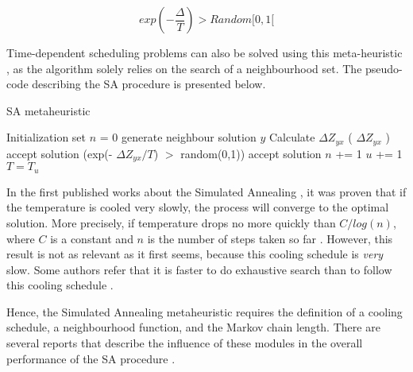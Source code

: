 \begin{equation}
\label{eq:metropolis}
  exp(-\frac{\Delta}{T}) > Random[0, 1[
\end{equation}

Time-dependent scheduling problems can also be solved using this meta-heuristic \cite{simulated_annealing_2}, as the algorithm solely relies on the search of a neighbourhood set. The pseudo-code describing the SA procedure  is presented below.

\makeatletter
\def\BState{\State\hskip-\ALG@thistlm}
\makeatother

\begin{algorithm}
\caption{SA metaheuristic}\label{eq:sa_metacode}
  \begin{algorithmic}[1]
    \State Initialization 
    \State set $n$ = 0
    \State generate neighbour solution $y$
    \State  Calculate $\Delta Z_{yx}$
    \If ( $\Delta Z_{yx}$ ) 
    \State accept solution 
    \Elif (exp(- $\Delta Z_{yx}/T$) $>$ random(0,1)) 
    \State accept solution
    \State  $n$ += 1
    \EndWhile
    \State  $u$ += 1
    \State $  T = T_{u}$
    \EndWhile
    \EndProcedure
  \end{algorithmic}
\end{algorithm}


In the first published works about the Simulated Annealing \cite{sa_convergence}, it was proven that if the temperature is cooled very slowly, the process will converge to the optimal solution. More precisely, if temperature drops no more quickly than $C/log(n)$, where $C$ is a constant and $n$ is the number of steps taken so far \cite{local_search_book}. However, this result is not as relevant as it first seems, because this cooling schedule is \textit{very} slow. Some authors refer that it is faster to do exhaustive search than to follow this cooling schedule \cite{local_search_book}.


Hence, the Simulated Annealing metaheuristic requires the definition of a cooling schedule, a neighbourhood function, and the Markov chain length. There are several reports that describe the influence of these modules in the overall performance of the SA procedure \cite{sa_cooling_influence}. 




